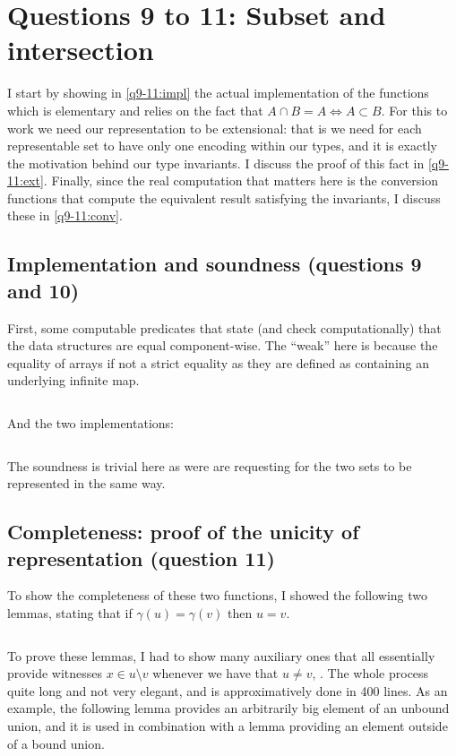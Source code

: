 \section{Questions 9 to 11: Subset and intersection}

I start by showing in \autoref{q9-11:impl} the actual implementation of the functions
which is elementary and relies on the fact that $A\cap B=A \iff A \subset B$.
%
For this to work we need our representation to be extensional: that is we need for
each representable set to have only one encoding within our types, and it is exactly
the motivation behind our type invariants. I discuss the proof of this fact in
\autoref{q9-11:ext}.
%
Finally, since the real computation that matters here is the conversion functions
that compute the equivalent result satisfying the invariants, I discuss these in
\autoref{q9-11:conv}.


\subsection{Implementation and soundness (questions 9 and 10)}\label{q9-11:impl}

First, some computable predicates that state (and check computationally) that the
data structures are equal component-wise.
%
The ``weak'' here is because the equality of arrays if not a strict equality as they
are defined as containing an underlying infinite map.
%
\inputminted{\whyml}{why3code/weak_eq.mlw}
And the two implementations:
\inputminted{\whyml}{why3code/incl_disj.mlw}

The soundness is trivial here as were are requesting for the two sets to be
represented in the same way.

\subsection{Completeness: proof of the unicity of representation (question
  11)}\label{q9-11:ext}

To show the completeness of these two functions, I showed the following two lemmas,
stating that if $\gamma(u)=\gamma(v)$ then $u = v$.
%
\inputminted{\whyml}{why3code/extentionality_lemmas.mlw}
%
To prove these lemmas, I had to show many auxiliary ones that all essentially provide
witnesses $x \in u \setminus v$ whenever we have that $u \neq v$, .
%
The whole process quite long and not very elegant, and is approximatively done in 400
lines. As an example, the following lemma provides an arbitrarily big element of an
unbound union, and it is used in combination with a lemma providing an element
outside of a bound union.
%
\inputminted{\whyml}{why3code/ghost_example.mlw}

